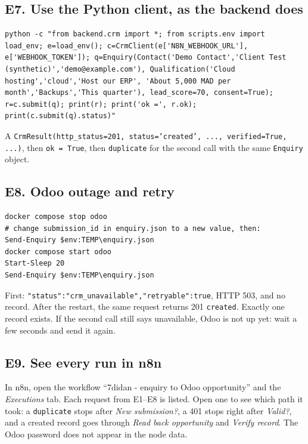 \documentclass[11pt,a4paper]{article}
\newcommand{\f}[1]{\texttt{#1}}
\begin{document}
\subsection{E7. Use the Python client, as the backend does}
\begin{lstlisting}
python -c "from backend.crm import *; from scripts.env import load_env; e=load_env(); c=CrmClient(e['N8N_WEBHOOK_URL'], e['WEBHOOK_TOKEN']); q=Enquiry(Contact('Demo Contact','Client Test (synthetic)','demo@example.com'), Qualification('Cloud hosting','cloud','Host our ERP', 'About 5,000 MAD per month','Backups','This quarter'), lead_score=70, consent=True); r=c.submit(q); print(r); print('ok =', r.ok); print(c.submit(q).status)"
\end{lstlisting}
\begin{expect}
A \f{CrmResult(http\_status=201, status='created', ..., verified=True, ...)}, then \f{ok = True},
then \f{duplicate} for the second call with the same \f{Enquiry} object.
\end{expect}

\subsection{E8. Odoo outage and retry}
\begin{lstlisting}
docker compose stop odoo
# change submission_id in enquiry.json to a new value, then:
Send-Enquiry $env:TEMP\enquiry.json
docker compose start odoo
Start-Sleep 20
Send-Enquiry $env:TEMP\enquiry.json
\end{lstlisting}
\begin{expect}
First: \f{"status":"crm\_unavailable","retryable":true}, HTTP 503, and no record.
After the restart, the same request returns 201 \f{created}. Exactly one record exists.
If the second call still says unavailable, Odoo is not up yet: wait a few seconds and send it again.
\end{expect}

\subsection{E9. See every run in n8n}
In n8n, open the workflow ``7didan - enquiry to Odoo opportunity'' and the \emph{Executions} tab.
Each request from E1--E8 is listed. Open one to see which path it took: a \f{duplicate} stops after
\emph{New submission?}, a 401 stops right after \emph{Valid?}, and a created record goes through
\emph{Read back opportunity} and \emph{Verify record}. The Odoo password does not appear in the node data.
\end{document}
